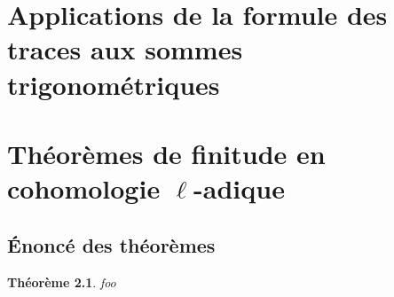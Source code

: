 \documentclass{book}
\newtheorem{theorem_}[subsection]{Théorème}
\begin{document}
\chapter{Applications de la formule des traces aux sommes trigonométriques}\label{VI}

\chapter{Théorèmes de finitude en cohomologie \texorpdfstring{$\ell$}{l}-adique}\label{VII}

\section{Énoncé des théorèmes}\label{VII:1}

\begin{theorem_}\label{VII:1-1}
foo
\end{theorem_}
\end{document}
